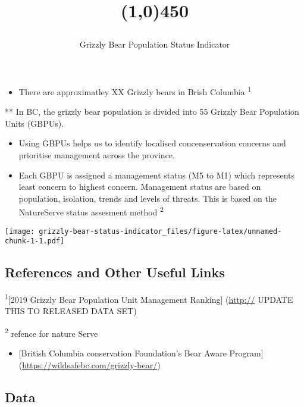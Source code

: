 \documentclass[a4paper, 11pt, parskip=half]{scrartcl}
\title{\vspace{-1cm}
         \flushleft{\texttt{[image: plants-and-animals.png]}
                    \hspace{0.3cm}\Huge{\topictitle{plants-and-animals}}}
         \vspace{-0.5cm}
         \begin{center}
         \line(1,0){450}
         \end{center}
  }
\subtitle{\LARGE{Grizzly Bear Population Status Indicator}}
\date{}
\providecommand{\tightlist}{%
  \setlength{\itemsep}{0pt}\setlength{\parskip}{0pt}}
\begin{document}
\maketitle
\vspace{-2cm} %
\thispagestyle{fancy}

\begin{itemize}
\tightlist
\item
  There are approximatley XX Grizzly bears in Brish Columbia
  \textsuperscript{1}
\end{itemize}

** In BC, the grizzly bear population is divided into 55 Grizzly Bear
Population Units (GBPUs).

\begin{itemize}
\item
  Using GBPUs helps us to identify localised concenservation concerns
  and prioritise management across the province.
\item
  Each GBPU is assigned a management status (M5 to M1) which represents
  least concern to highest concern. Management status are based on
  population, isolation, trends and levels of threats. This is based on
  the NatureServe status assesment method \textsuperscript{2}
\end{itemize}

\texttt{[image: grizzly-bear-status-indicator\_files/figure-latex/unnamed-chunk-1-1.pdf]}

\hypertarget{references-and-other-useful-links}{%
\subsection{References and Other Useful
Links}\label{references-and-other-useful-links}}

\textsuperscript{1}{[}2019 Grizzly Bear Population Unit Management
Ranking{]} (\url{http://} UPDATE THIS TO RELEASED DATA SET)

\textsuperscript{2} refence for nature Serve

\begin{itemize}
\tightlist
\item
  {[}British Columbia conservation Foundation's Bear Aware Program{]}
  (\url{https://wildsafebc.com/grizzly-bear/})
\end{itemize}

\hypertarget{data}{%
\subsection{Data}\label{data}}
\end{document}
